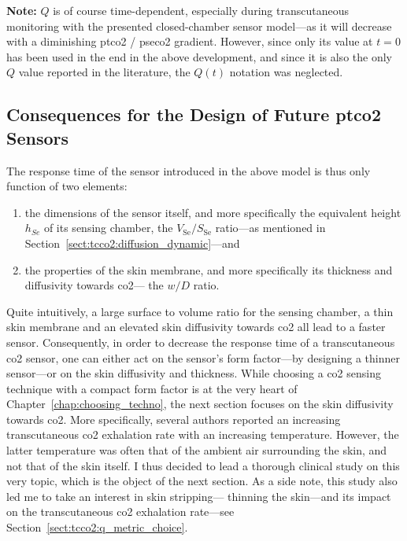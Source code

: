 \textbf{Note:} $Q$ is of course time-dependent, especially during transcutaneous monitoring with the presented closed-chamber sensor model---as it will decrease with a diminishing \gls{ptco2} / \gls{pseco2} gradient. However, since only its value at $t=0$ has been used in the end in the above development, and since it is also the only $Q$ value reported in the literature, the $Q(t)$ notation was neglected.

\subsection{Consequences for the Design of Future \texorpdfstring{\gls{ptco2}}{tcpCO2} Sensors}

The response time of the sensor introduced in the above model is thus only function of two elements:
\begin{enumerate}
	\item the dimensions of the sensor itself, and more specifically the equivalent height $h_{Se}$ of its sensing chamber, \ie{} the $V_\text{Se}/S_\text{Se}$ ratio---as mentioned in Section~\ref{sect:tcco2:diffusion_dynamic}---and
	\item the properties of the skin membrane, and more specifically its thickness and diffusivity towards \gls{co2}---\ie{} the $w/D$ ratio.
\end{enumerate}

Quite intuitively, a large surface to volume ratio for the sensing chamber, a thin skin membrane and an elevated skin diffusivity towards \gls{co2} all lead to a faster sensor. Consequently, in order to decrease the response time of a transcutaneous \gls{co2} sensor, one can either act on the sensor's form factor---by designing a thinner sensor---or on the skin diffusivity and thickness. While choosing a \gls{co2} sensing technique with a compact form factor is at the very heart of Chapter~\ref{chap:choosing_techno}, the next section focuses on the skin diffusivity towards \gls{co2}. More specifically, several authors reported an increasing transcutaneous \gls{co2} exhalation rate with an increasing temperature\cite{shaw1929, shaw1930, whitehouse1932}. However, the latter temperature was often that of the ambient air surrounding the skin, and not that of the skin itself. I thus decided to lead a thorough clinical study on this very topic, which is the object of the next section. As a side note, this study also led me to take an interest in skin stripping---\ie{} thinning the skin---and its impact on the transcutaneous \gls{co2} exhalation rate---see Section~\ref{sect:tcco2:q_metric_choice}.

